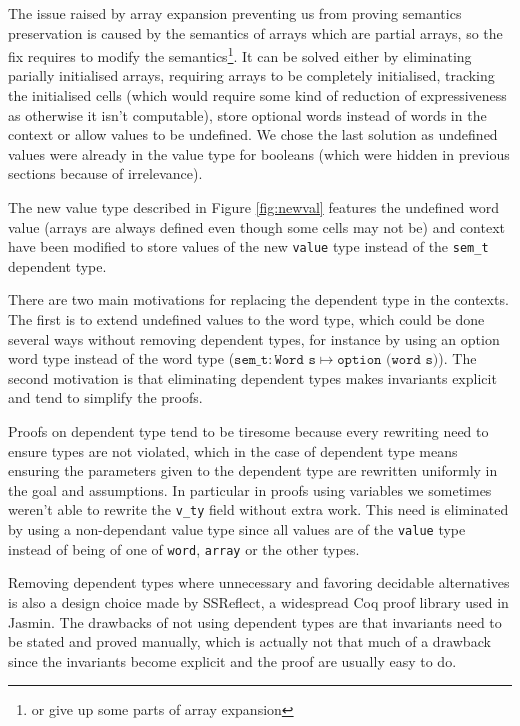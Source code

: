 \documentclass{article}
\begin{document}
\smallskip

The issue raised by array expansion preventing us from proving semantics
preservation is caused by the semantics of arrays which are partial arrays, so
the fix requires to modify the semantics\footnote{or give up some parts of array
expansion}. It can be solved either by eliminating parially initialised arrays,
requiring arrays to be completely initialised, tracking the initialised cells
(which would require some kind of reduction of expressiveness as otherwise it
isn’t computable), store optional words instead of words in the context or allow
values to be undefined. We chose the last solution as undefined values were
already in the value type for booleans (which were hidden in previous sections
because of irrelevance).

The new value type described in Figure \ref{fig:newval} features the undefined
word value (arrays are always defined even though some cells may not be) and
context have been modified to store values of the new \texttt{value} type
instead of the \texttt{sem\_t} dependent type.

\smallskip

There are two main motivations for replacing the dependent type in the contexts.
The first is to extend undefined values to the word type, which could be done
several ways without removing dependent types, for instance by using an option
word type instead of the word type
(\(\texttt{sem\_t} : \texttt{Word s} \mapsto \texttt{option (word s)}\)).
The second motivation is that eliminating dependent types makes invariants
explicit and tend to simplify the proofs.

Proofs on dependent type tend to be tiresome because every rewriting need to
ensure types are not violated, which in the case of dependent type means
ensuring the parameters given to the dependent type are rewritten uniformly in
the goal and assumptions. In particular in proofs using variables we sometimes
weren't able to rewrite the \texttt{v\_ty} field without extra work. This need
is eliminated by using a non-dependant value type since all values are of the
\texttt{value} type instead of being of one of \texttt{word}, \texttt{array} or
the other types.

Removing dependent types where unnecessary and favoring decidable alternatives
is also a design choice made by SSReflect, a widespread Coq proof library used
in Jasmin. The drawbacks of not using dependent types are that invariants need
to be stated and proved manually, which is actually not that much of a drawback
since the invariants become explicit and the proof are usually easy to do.
\end{document}
